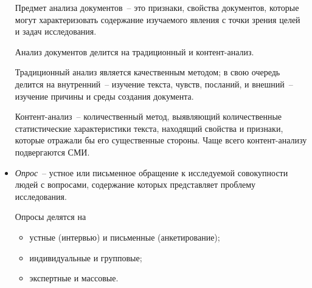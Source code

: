 \begin{itemize}
        Предмет анализа документов~-- это признаки, свойства документов, которые
        могут характеризовать содержание изучаемого явления с точки зрения целей
        и задач исследования.

        Анализ документов делится на традиционный и контент-анализ.

        Традиционный анализ является качественным методом; в свою очередь
        делится на внутренний~-- изучение текста, чувств, посланий, и
        внешний~-- изучение причины и среды создания документа.

        Контент-анализ~-- количественный метод, выявляющий количественные
        статистические характеристики текста, находящий свойства и признаки,
        которые отражали бы его существенные стороны. Чаще всего контент-анализу
        подвергаются СМИ.

      \item \emph{Опрос}~-- устное или письменное обращение к исследуемой
        совокупности людей с вопросами, содержание которых представляет проблему
        исследования.

        Опросы делятся на
        \begin{itemize}
          \item устные (интервью) и письменные (анкетирование);
          \item индивидуальные и групповые;
          \item экспертные и массовые.
        \end{itemize}
    \end{itemize}
  